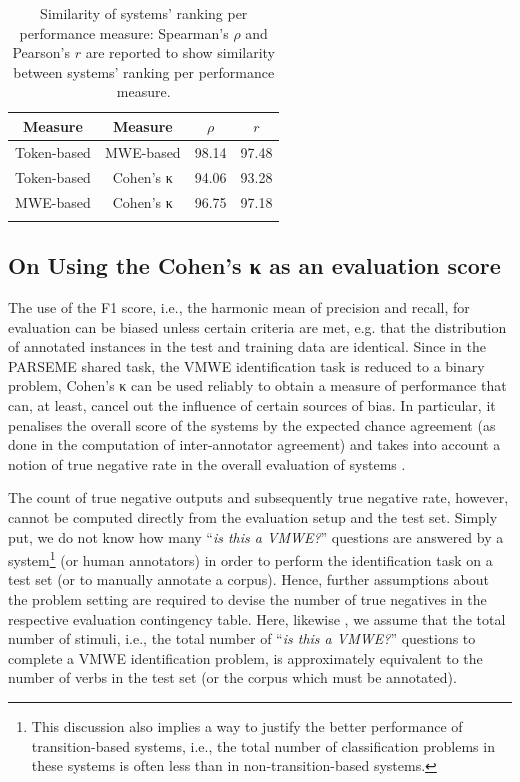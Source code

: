 \documentclass[output=paper,modfonts,nonflat,draftmode]{langsci/langscibook}
\begin{document}
\begin{table}
\centering
\caption{Similarity of systems' ranking per performance measure: Spearman's $\rho$ and Pearson's $r$ %
are reported to show similarity between systems' ranking per performance measure.}
\label{similarity-of-measures}
\begin{tabular}{cccc}%
\lsptoprule
Measure & Measure & $\rho$ & $r$ \tabularnewline
\midrule
Token-based & MWE-based        & 98.14 & 97.48 \tabularnewline
Token-based & Cohen's κ & 94.06 & 93.28 \tabularnewline
MWE-based   & Cohen's κ & 96.75 & 97.18 \tabularnewline
\lspbottomrule
\end{tabular}
\end{table}



\subsection{On Using the Cohen's κ as an evaluation score}

The use of the F1 score, i.e., the harmonic mean of precision and recall, for evaluation can be biased unless certain criteria are met, e.g. that the distribution of annotated instances in the test and training data are identical. Since in the PARSEME shared task, the VMWE identification task is reduced to a binary  problem, Cohen's κ can be used reliably to obtain a measure of performance that can, at least, cancel out the influence of certain sources of bias. In particular, it penalises the overall score of the systems by the expected chance agreement (as done in the computation of inter-annotator agreement) and takes into account a notion of true negative rate in the overall evaluation of systems \citep{Powers2012,Powers15}. 

\largerpage
The count of true negative outputs and subsequently true negative rate, however, cannot be computed directly from the evaluation setup and the test set. Simply put, we do not know how many ``\emph{is this a VMWE?}'' questions are answered by a system\footnote{This discussion also implies a way to justify the better performance of transition-based systems, i.e., the total number of classification problems in these systems is often less than in non-transition-based systems.} (or human annotators) in order to perform the identification task on a test set (or to manually annotate a corpus). Hence, further assumptions about the problem setting are required to devise the number of true negatives in the respective evaluation contingency table. Here, likewise \citep{MWEWorkshop}, we assume that the total number of stimuli, i.e., the total number of ``\emph{is this a VMWE?}'' questions to complete a VMWE identification problem, is approximately equivalent to the number of verbs in the test set (or the corpus which must be annotated).
\end{document}
